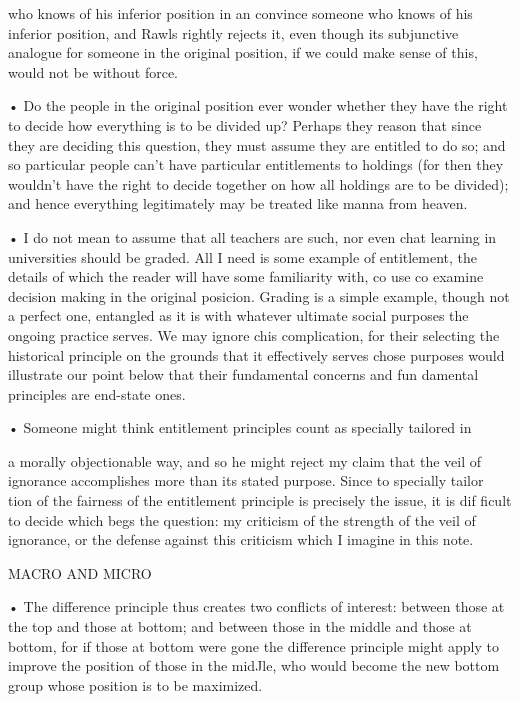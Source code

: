 \documentclass[11pt,openany]{book}
\begin{document}
{who knows of his inferior position in an convince someone who knows of his inferior position, and Rawls rightly rejects it, even though its subjunctive analogue for someone in the original position, if we could make sense of this, would not be without force.\par

• Do the people in the original position ever wonder whether they have the right to decide how everything is to be divided up? Perhaps they reason that since they are deciding this question, they must assume they are entitled to do so; and so particular people can't have particular entitlements to holdings (for then they wouldn't have the right to decide together on how all holdings are to be divided); and hence everything legitimately may be treated like manna from heaven.\par

• I do not mean to assume that all teachers are such, nor even chat learning in universities should be graded. All I need is some example of entitlement, the details of which the reader will have some familiarity with, co use co examine decision making in the original posicion. Grading is a simple example, though not a perfect one, entangled as it is with whatever ultimate social purposes the ongoing practice serves. We may ignore chis complication, for their selecting the historical principle on the grounds that it effectively serves chose purposes would illustrate our point below that their fundamental concerns and fun damental principles are end-state ones.\par

• Someone might think entitlement principles count as specially tailored in\par

a morally objectionable way, and so he might reject my claim that the veil of ignorance accomplishes more than its stated purpose. Since to specially tailor tion of the fairness of the entitlement principle is precisely the issue, it is dif ficult to decide which begs the question: my criticism of the strength of the veil of ignorance, or the defense against this criticism which I imagine in this note.\par

MACRO AND MICRO\par

• The difference principle thus creates two conflicts of interest: between those at the top and those at bottom; and between those in the middle and those at bottom, for if those at bottom were gone the difference principle might apply to improve the position of those in the midJle, who would become the new bottom group whose position is to be maximized.\par

}
\end{document}

